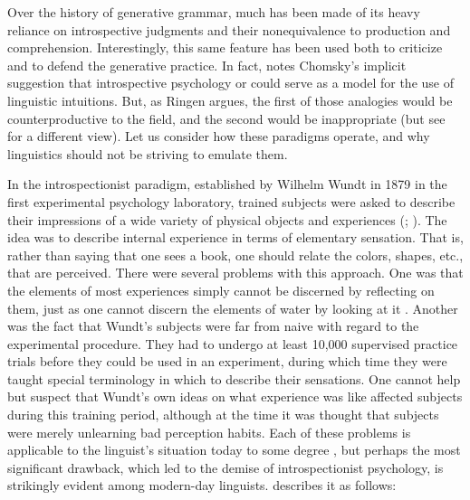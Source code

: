 \noindent 
Over the history of generative grammar, much has been made of its heavy reliance on introspective judgments and their nonequivalence to production and comprehension. Interestingly, this same feature has been used both to criticize and to defend the generative practice. In fact, \citet{Ringen1977} notes Chomsky's implicit suggestion that introspective psychology or  could serve as a model for the use of linguistic intuitions. But, as Ringen argues, the first of those analogies would be counterproductive to the field, and the second would be inappropriate (but see \citet[6\textendash{}7]{Cowart1997} for a different view). Let
us consider how these paradigms operate, and why linguistics should not be striving to emulate them.

In the introspectionist paradigm, established by Wilhelm Wundt in 1879 in the first experimental psychology laboratory, trained subjects were asked to describe their impressions of a wide variety of physical objects and experiences (\citet{Wundt1896}; \citet{Boring1953}). The idea was to describe internal experience in terms of elementary sensation. That is, rather than saying that one sees a book, one should relate the colors, shapes, etc., that are perceived. There were several problems with this approach. One was that the elements of most experiences simply cannot be discerned by reflecting on them, just as one cannot discern the elements of water by looking at it \citep{Dellarosa1988}. Another was the fact that Wundt's subjects were far from naive with regard to the experimental procedure. They had to undergo at least 10,000 supervised practice trials before they could be used in an experiment, during which time they were taught special terminology in which to describe their sensations. One cannot help but suspect that Wundt's own ideas on what experience was like affected subjects during this training period, although at the time it was thought that subjects were merely unlearning bad perception habits. Each of these problems is applicable to the linguist's situation today to some degree \citep[vol. 3]{Levelt1974}, but perhaps the most significant drawback, which led to the
demise of introspectionist psychology, is strikingly evident among modern-day linguists. \citet{Dellarosa1988} describes it as follows:

